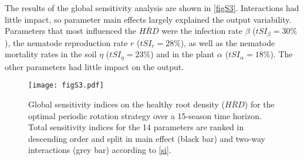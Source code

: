The results of the global sensitivity analysis are shown in \autoref{figS3}. 
Interactions had little impact, so  parameter main effects largely explained the output variability. Parameters that most influenced the $\overline{HRD}$ were 
the infection rate $\beta$ ($tSI_\beta=30\%$ ), the nematode reproduction rate $r$ ($tSI_r=28\%$), as well as the nematode mortality rates in the soil $\eta$ ($tSI_\eta=23\%$) and in the plant $\alpha$ ($tSI_\alpha=18\%$). The other parameters had little impact on the output.

\begin{figure}[ht]
  \centering
  \texttt{[image: figS3.pdf]}
  \caption[Global sensitivity indices on the performance for the optimal periodic rotation strategy over a 15-season time horizon]{Global sensitivity indices on the healthy root density ($\overline{HRD}$) for the optimal periodic rotation strategy over a 15-season time horizon.  Total sensitivity indices for the 14 parameters are ranked in descending order and split in main effect (black bar) and two-way interactions (grey bar) according to \eqref{si}.}
\label{figS3}
\end{figure}

